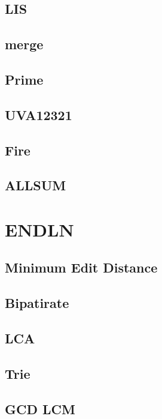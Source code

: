     \subsection{LIS}
        
    \subsection{merge}
          
    \subsection{Prime}
        
    \subsection{UVA12321}
        
    \subsection{Fire}
        
    \subsection{ALLSUM}
        

\section{ENDLN}
    \subsection{Minimum Edit Distance}
        
    \subsection{Bipatirate}
        
    \subsection{LCA}
        
    \subsection{Trie}
        
    \subsection{GCD LCM}
        
    
